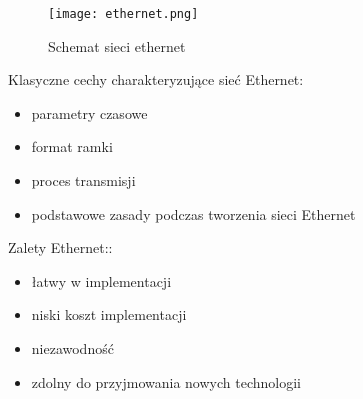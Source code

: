 \documentclass[a4paper,12pt,oneside]{book}
\begin{document}
				\begin{figure}[h!]
					\centering\texttt{[image: ethernet.png]}
					\caption{Schemat sieci ethernet}
				\end{figure}
				
				Klasyczne cechy charakteryzujące sieć Ethernet:
				\begin{itemize}
					\item parametry czasowe
					\item format ramki
					\item proces transmisji
					\item podstawowe zasady podczas tworzenia sieci Ethernet
				\end{itemize}
			
				Zalety Ethernet::
				\begin{itemize}
					\item łatwy w implementacji
					\item niski koszt implementacji
					\item niezawodność
					\item zdolny do przyjmowania nowych technologii
				\end{itemize}
			
\end{document}
